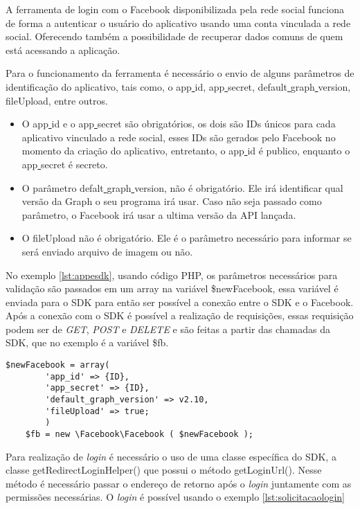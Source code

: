 A ferramenta de login com o Facebook disponibilizada pela rede social funciona de forma a autenticar o usuário do aplicativo usando uma conta vinculada a rede social. Oferecendo também a possibilidade de recuperar dados comuns de quem está acessando a aplicação.

Para o funcionamento da ferramenta é necessário o envio de alguns parâmetros de identificação do aplicativo, tais como, o app\underline{{ }}id, app\underline{{ }}secret, default\underline{{ }}graph\underline{{ }}version, fileUpload, entre outros.

\begin{itemize}
\item O app\underline{{ }}id e o app\underline{{ }}secret são obrigatórios, os dois são IDs únicos para cada aplicativo vinculado a rede social, esses IDs são gerados pelo Facebook no momento da criação do aplicativo, entretanto, o app\underline{{ }}id é publico, enquanto o app\underline{{ }}secret é secreto.

\item O parâmetro defalt\underline{{ }}graph\underline{{ }}version, não é obrigatório. Ele irá identificar qual versão da Graph o seu programa irá usar. Caso não seja passado como parâmetro, o Facebook irá usar a ultima versão da API lançada.

\item O fileUpload não é obrigatório. Ele é o parâmetro necessário para informar se será enviado arquivo de imagem ou não.
\end{itemize}

No exemplo \ref{lst:appesdk}, usando código PHP, os parâmetros necessários para validação são passados em um array na variável \$newFacebook, essa variável é enviada para o SDK para então ser possível a conexão entre o SDK e o Facebook. Após a conexão com o SDK é possível a realização de requisições, essas requisição podem ser de \textit{GET}, \textit{POST} e \textit{DELETE} e são feitas a partir das chamadas da SDK, que no exemplo é a variável \$fb.

\begin{lstlisting}[caption={Conexão entre aplicativo e SDK},label={lst:appesdk}]
	$newFacebook = array(
		'app_id' => {ID},
		'app_secret' => {ID},
		'default_graph_version' => v2.10,
		'fileUpload' => true;
		)
	$fb = new \Facebook\Facebook ( $newFacebook );
\end{lstlisting}

Para realização de \textit{login} é necessário o uso de uma classe específica do SDK, a classe getRedirectLoginHelper() que possui o método getLoginUrl(). Nesse método é necessário passar o endereço de retorno após o \textit{login} juntamente com as permissões necessárias. O \textit{login} é possível usando o exemplo \ref{lst:solicitacaologin}


